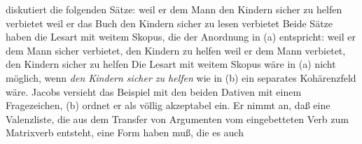 \citet[]{Jacobs91a} diskutiert die folgenden Sätze:
\eal
\ex{}
weil    er       dem Mann      den Kindern        sicher zu helfen verbietet
\ex
weil    er       das Buch      den Kindern        sicher zu lesen verbietet
\zl
Beide Sätze haben die Lesart mit weitem Skopus, die der Anordnung in (a) entspricht:
\eal
\ex weil er dem Mann sicher verbietet, den Kindern zu helfen
\ex weil er dem Mann verbietet, den Kindern sicher zu helfen
\zl
Die Lesart mit weitem Skopus wäre in (a) nicht möglich, wenn \emph{den Kindern sicher zu
  helfen} wie in (b) ein separates Kohärenzfeld wäre. Jacobs versieht das Beispiel mit den beiden Dativen
mit einem Fragezeichen, (b) ordnet er als völlig akzeptabel ein.
Er nimmt an, daß eine Valenzliste, die aus dem Transfer von Argumenten vom
eingebetteten Verb zum Matrixverb entsteht, eine Form haben muß, die es auch
